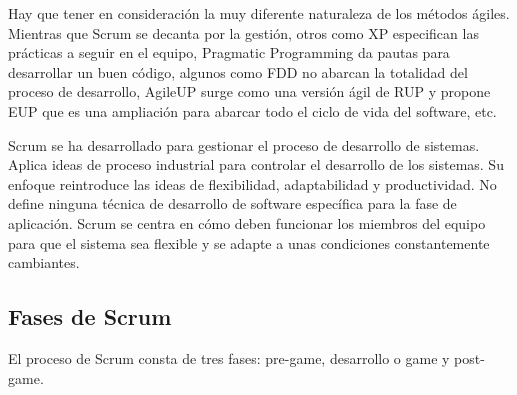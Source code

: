 Hay que tener en consideración la muy diferente naturaleza de los métodos ágiles. Mientras que Scrum se decanta por la gestión, otros como XP especifican las prácticas a seguir en el equipo, Pragmatic Programming da pautas para desarrollar un buen código, algunos como FDD no abarcan la totalidad del proceso de desarrollo, AgileUP surge como una versión ágil de RUP y propone EUP que es una ampliación para abarcar todo el ciclo de vida del software, etc.

Scrum se ha desarrollado para gestionar el proceso de desarrollo de sistemas. Aplica ideas de proceso industrial para controlar el desarrollo de los sistemas. Su enfoque reintroduce las ideas de flexibilidad, adaptabilidad y productividad. No define ninguna técnica de desarrollo de software específica para la fase de aplicación. Scrum se centra en cómo deben funcionar los miembros del equipo para que el sistema sea flexible y se adapte a unas condiciones
constantemente cambiantes.

\subsection{Fases de Scrum}
El proceso de Scrum consta de tres fases: pre-game, desarrollo o game y post-game.

